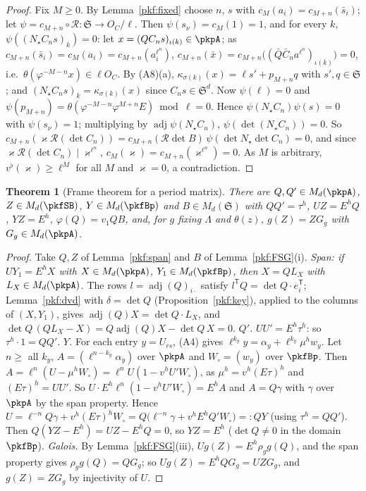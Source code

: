 \documentclass[10pt]{amsart}
\newtheorem{theorem}{Theorem}[section]
\theoremstyle{definition}
\theoremstyle{remark}
\begin{document}
\begin{proof}
Fix $M\ge0$. By Lemma~\ref{pkf:fixed} choose $n$, $s$ with $c_M(a_i)=c_{M+n}(\bar s_i)$; let
$\psi=c_{M+n}\circ\mathcal R\colon\mathfrak S\to O_C/\ell$. Then $\psi(s_\nu)=c_M(1)=1$, and for every
$k$, $\psi((N_\star C_ns)_k)=0$: let $x=(QC_ns)_{\iota(k)}\in\pkpA$; as $c_{M+n}(\bar s_i)=c_M(a_i)=
c_{M+n}(a_i^{\ell^n})$, $c_{M+n}(\bar x)=c_{M+n}\bigl((\bar Q\bar C_na^{\ell^n})_{\iota(k)}\bigr)=0$, i.e.\
$\theta(\varphi^{-M-n}x)\in\ell O_C$. By (A8)(a), $\kappa_{\sigma(k)}(x)=\ell s'+p_{M+n}q$ with
$s',q\in\mathfrak S$; and $(N_\star C_ns)_k=\kappa_{\sigma(k)}(x)$ since $C_ns\in\mathfrak S^d$. Now $\psi(\ell)=0$ and
$\psi(p_{M+n})=\theta(\varphi^{-M-n}\varphi^{M+n}E)\bmod\ell=0$. Hence $\psi(N_\star C_n)\psi(s)=0$ with
$\psi(s_\nu)=1$; multiplying by $\operatorname{adj}\psi(N_\star C_n)$, $\psi(\det(N_\star C_n))=0$. So
$c_{M+n}(\varkappa\mathcal R(\det C_n))=c_{M+n}(\mathcal R\det B)\,\psi(\det N_\star\det C_n)=0$, and since
$\varkappa\mathcal R(\det C_n)\mid \varkappa^{\ell^n}$, $c_M(\varkappa)=c_{M+n}(\varkappa^{\ell^n})=0$. As $M$ is arbitrary,
$v^\flat(\varkappa)\ge\ell^M$ for all $M$ and $\varkappa=0$, a contradiction.
\end{proof}

\begin{theorem}[Frame theorem for a period matrix]\label{pkf:frame-pm}
There are $Q,Q'\in M_d(\pkpA)$, $Z\in M_d(\pkfSB)$, $Y\in M_d(\pkfBp)$ and $B\in M_d(\mathfrak S)$ with
$QQ'=\tau^h$, $UZ=E^hQ$, $YZ=E^h$, $\varphi(Q)=v_1QB$, and, for $g$ fixing $\Lambda$ and $\theta(z)$,
$g(Z)=ZG_g$ with $G_g\in M_d(\pkpA)$.
\end{theorem}

\begin{proof}
Take $Q,Z$ of Lemma~\ref{pkf:span} and $B$ of Lemma~\ref{pkf:FSG}(i).
\emph{Span: if $UY_1=E^hX$ with $X\in M_d(\pkpA)$, $Y_1\in M_d(\pkfBp)$, then $X=QL_X$ with $L_X\in
M_d(\pkpA)$.} The rows $l=\operatorname{adj}(Q)_{i\cdot}$ satisfy $l^{\mathsf T}Q=\det Q\cdot e_i^{\mathsf T}$;
Lemma~\ref{pkf:dvd} with $\delta=\det Q$ (Proposition~\ref{pkf:key}), applied to the columns of $(X,Y_1)$,
gives $\operatorname{adj}(Q)X=\det Q\cdot L_X$, and $\det Q\,(QL_X-X)=Q\operatorname{adj}(Q)X-\det Q\,X=0$.
\emph{$Q'$.} $UU'=E^h\tau^h$: so $\tau^h\cdot1=QQ'$.
\emph{$Y$.} For each entry $y=U_{rs}$, (A4) gives $\ell^{k_y}y=\alpha_y+\ell^{k_y}\mu^hw_y$. Let $n\ge$
all $k_y$, $A=(\ell^{n-k_y}\alpha_y)$ over $\pkpA$ and $W_\circ=(w_y)$ over $\pkfBp$. Then
$A=\ell^n(U-\mu^hW_\circ)=\ell^nU(1-v^{h}_{\phantom{1}}U'W_\circ)$, as $\mu^h=v^h(E\tau)^h$ and $(E\tau)^h=UU'$.
So $U\cdot E^h\ell^n(1-v^hU'W_\circ)=E^hA$ and $A=Q\gamma$ with $\gamma$ over $\pkpA$ by the span property.
Hence $U=\ell^{-n}Q\gamma+v^h(E\tau)^hW_\circ=Q\bigl(\ell^{-n}\gamma+v^hE^hQ'W_\circ\bigr)=:QY$ (using
$\tau^h=QQ'$). Then $Q(YZ-E^h)=UZ-E^hQ=0$, so $YZ=E^h$ ($\det Q\ne0$ in the domain $\pkfBp$).
\emph{Galois.} By Lemma~\ref{pkf:FSG}(iii), $Ug(Z)=E^h\rho_gg(Q)$, and the span property gives
$\rho_gg(Q)=QG_g$; so $Ug(Z)=E^hQG_g=UZG_g$, and $g(Z)=ZG_g$ by injectivity of $U$.
\end{proof}
\end{document}
